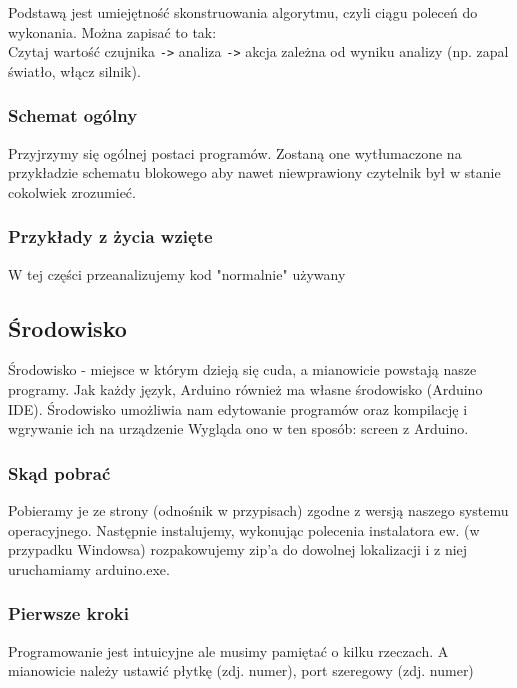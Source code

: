 \documentclass[a4paper,12pt, twoside]{article}
\begin{document}
	Podstawą jest umiejętność skonstruowania algorytmu, czyli ciągu poleceń do wykonania. Można zapisać to tak:
	\\Czytaj wartość czujnika \verb|->| analiza \verb|->| akcja zależna od wyniku analizy (np. zapal światło, włącz silnik).
\subsubsection{Schemat ogólny}
	Przyjrzymy się ogólnej postaci programów. Zostaną one wytłumaczone na przykładzie schematu blokowego aby nawet niewprawiony czytelnik był w stanie cokolwiek zrozumieć.
\subsubsection{Przykłady z życia wzięte}
W tej części przeanalizujemy kod "normalnie" używany
	\subsection{Środowisko}
	Środowisko - miejsce w którym dzieją się cuda, a mianowicie powstają nasze programy. Jak każdy język, Arduino również ma własne środowisko (Arduino IDE).
	Środowisko umożliwia nam edytowanie programów oraz kompilację i wgrywanie ich na urządzenie %
		Wygląda ono w ten sposób: screen z Arduino. 
	\subsubsection{Skąd pobrać}
	Pobieramy je ze strony (odnośnik w przypisach) zgodne z wersją naszego systemu operacyjnego. Następnie instalujemy, wykonując polecenia instalatora
	ew. (w przypadku Windowsa) rozpakowujemy zip'a do dowolnej lokalizacji i z niej uruchamiamy arduino.exe.
\subsubsection{Pierwsze kroki}
Programowanie jest intuicyjne ale musimy pamiętać o kilku rzeczach. A mianowicie należy ustawić płytkę (zdj. numer),  port szeregowy (zdj. numer)%
\end{document}
